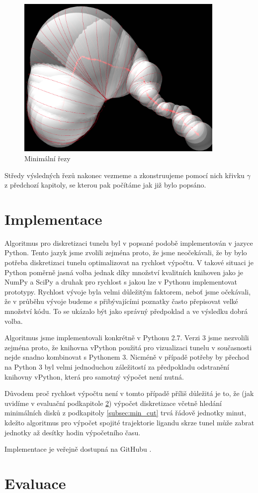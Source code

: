 \begin{figure}[ht]
    \centering
    \includegraphics[width=100mm]{img/min_cuts.png}
    \caption{Minimální řezy}
  \centering
  \label{fig:min_cuts}
\end{figure}

Středy výsledných řezů nakonec vezmeme a zkonstruujeme pomocí nich křivku
$ \gamma $ z předchozí kapitoly, se kterou pak počítáme jak již bylo popsáno.

\section{Implementace} \label{subsec:implementation}
Algoritmus pro diskretizaci tunelu byl v popsané podobě implementován v
jazyce Python. Tento jazyk jsme zvolili zejména proto, že jsme neočekávali, že
by bylo potřeba diskretizaci tunelu optimalizovat na rychlost výpočtu. V takové
situaci je Python poměrně jasná volba jednak díky množství kvalitních
knihoven jako je NumPy a SciPy a druhak pro rychlost s jakou lze v Pythonu
implementovat prototypy. Rychlost vývoje byla velmi důležitým faktorem, neboť
jsme očekávali, že v průběhu vývoje budeme s přibývajícími poznatky často
přepisovat velké množství kódu. To se ukázalo být jako správný předpoklad
a ve výsledku dobrá volba.

Algoritmus jsme implementovali konkrétně v Pythonu 2.7. Verzi 3 jsme nezvolili
zejména proto, že knihovna vPython použitá pro vizualizaci tunelu v současnosti
nejde snadno kombinovat s Pythonem 3. Nicméně v případě potřeby by přechod na
Python 3 byl velmi jednoduchou záležitostí za předpokladu odstranění knihovny
vPython, která pro samotný výpočet není nutná.

Důvodem proč rychlost výpočtu není v tomto případě příliš důležitá je to, že
(jak uvidíme v evaluační podkapitole \ref{subsec:evaluation}) výpočet diskretizace
včetně hledání minimálních disků z podkapitoly \ref{subsec:min_cut} trvá řádově
jednotky minut, kdežto algoritmus pro výpočet spojité trajektorie ligandu skrze
tunel může zabrat jednotky až desítky hodin výpočetního času.

Implementace je veřejně dostupná na GitHubu \cite{discretizer}.

\section{Evaluace} \label{subsec:evaluation}
